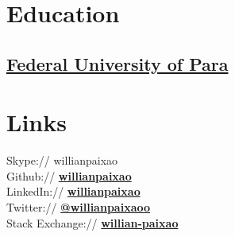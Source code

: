 \documentclass[]{willianpaixao-resume}
\begin{document}
\lastupdated



\begin{minipage}[t]{0.35\textwidth} 


\section{Education}

\subsection{\href{http://www.portal.ufpa.br/}{Federal University of Para}}
\sectionsep


\section{Links} 
Skype:// willianpaixao \\
Github:// \href{https://github.com/willianpaixao}{\bf willianpaixao} \\
LinkedIn://  \href{https://www.linkedin.com/in/willianpaixao}{\bf willianpaixao} \\
Twitter://  \href{https://twitter.com/willianpaixaoo}{\bf @willianpaixaoo}\\
Stack Exchange://  \href{http://stackexchange.com/users/1687314/willian-paixao}{\bf willian-paixao}
\sectionsep


\end{minipage}
\end{document}
